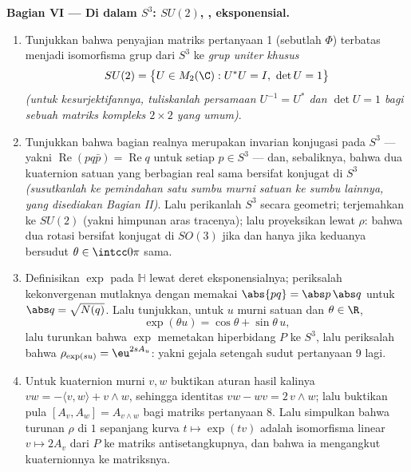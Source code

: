 \begin{problem}
\medskip
\noindent\textbf{Bagian VI --- Di dalam $S^3$: $SU(2)$,
, eksponensial.}
\begin{enumerate}[resume]
  \item Tunjukkan bahwa penyajian matriks pertanyaan 1
        (sebutlah $\Phi$) terbatas menjadi isomorfisma grup
        dari $S^3$ ke \emph{grup uniter khusus}
        \[
        SU(2) = \bigl\{U \in M_2(\C) : U^*U = I,\ \det U =
        1\bigr\}
        \]
        \emph{(untuk kesurjektifannya, tuliskanlah persamaan
        $U^{-1} = U^*$ dan $\det U = 1$ bagi sebuah matriks
        kompleks $2\times2$ yang umum)}.
  \item Tunjukkan bahwa bagian realnya merupakan invarian konjugasi
        pada $S^3$ --- yakni $\operatorname{Re}(pq\bar p) =
        \operatorname{Re}q$ untuk setiap $p \in S^3$ --- dan,
        sebaliknya, bahwa dua kuaternion satuan yang berbagian
        real sama bersifat konjugat di $S^3$ \emph{(susutkanlah ke
        pemindahan satu sumbu murni satuan ke sumbu lainnya, yang disediakan Bagian
        II)}. Lalu perikanlah 
        $S^3$ secara geometri; terjemahkan ke $SU(2)$ (yakni himpunan
        aras tracenya); lalu proyeksikan lewat $\rho$: bahwa dua
        rotasi bersifat konjugat di $SO(3)$ jika dan hanya jika
        keduanya bersudut $\theta \in \intcc0\pi$ sama.
  \item Definisikan $\exp$ pada $\mathbb H$ lewat deret
        eksponensialnya; periksalah kekonvergenan mutlaknya dengan memakai
        $\abs{pq} = \abs p\,\abs q$ untuk $\abs q =
        \sqrt{N(q)}$. Lalu tunjukkan, untuk $u$ murni satuan dan $\theta
        \in \R$,
        \[
        \exp(\theta u) = \cos\theta + \sin\theta\,u ,
        \]
        lalu turunkan bahwa $\exp$ memetakan hiperbidang $P$ ke
        $S^3$, lalu periksalah bahwa $\rho_{\exp(su)} =
        \eu^{2sA_u}$: yakni gejala setengah sudut pertanyaan
        9 lagi.
  \item Untuk kuaternion murni $v, w$ buktikan aturan hasil kalinya
        $vw = -\langle v, w\rangle + v\wedge w$, sehingga
        identitas  $vw - wv = 2\,v\wedge w$; lalu buktikan
        pula $[A_v, A_w] = A_{v\wedge w}$ bagi matriks
        pertanyaan 8. Lalu simpulkan bahwa turunan
        $\rho$ di $1$ sepanjang kurva $t \mapsto \exp(tv)$
        adalah isomorfisma linear $v \mapsto 2A_v$ dari $P$
        ke matriks antisetangkupnya, dan bahwa ia
        mengangkut  kuaternionnya ke 
        matriksnya.
\end{enumerate}


\end{problem}
